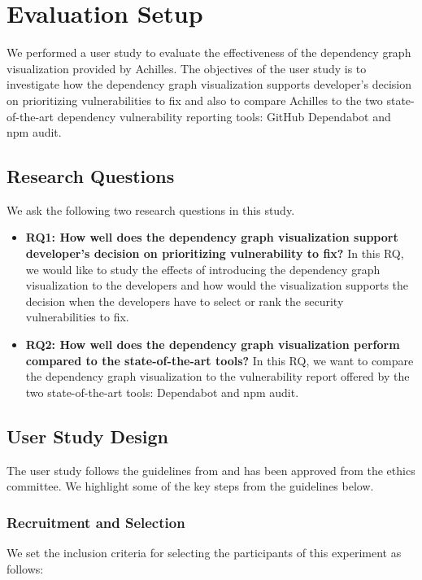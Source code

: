 \documentclass[conference]{IEEEtran}
\begin{document}
	\section{Evaluation Setup}
	We performed a user study to evaluate the effectiveness of the dependency graph visualization provided by Achilles.
	The objectives of the user study is to investigate how the dependency graph visualization supports developer’s decision on prioritizing vulnerabilities to fix and also to compare Achilles to the two state-of-the-art dependency vulnerability reporting tools: GitHub Dependabot and npm audit. 
	
	\subsection{Research Questions}
	We ask the following two research questions in this study.
	
	\begin{itemize}
		\item \textbf{RQ1: How well does the dependency graph visualization support developer’s decision on prioritizing vulnerability to fix?} In this RQ, we would like to study the effects of introducing the dependency graph visualization to the developers and how would the visualization supports the decision when the developers have to select or rank the security vulnerabilities to fix.
		\item \textbf{RQ2: How well does the dependency graph visualization perform compared to the state-of-the-art tools?} In this RQ, we want to compare the dependency graph visualization to the vulnerability report offered by the two state-of-the-art tools: Dependabot and npm audit.
	\end{itemize}
	
	\subsection{User Study Design}
	The user study follows the guidelines from \citet{Ko2013} and has been approved from the ethics committee. We highlight some of the key steps from the guidelines below.
	
	\subsubsection{Recruitment and Selection}
	We set the inclusion criteria for selecting the participants of this experiment as follows:
	
\end{document}
